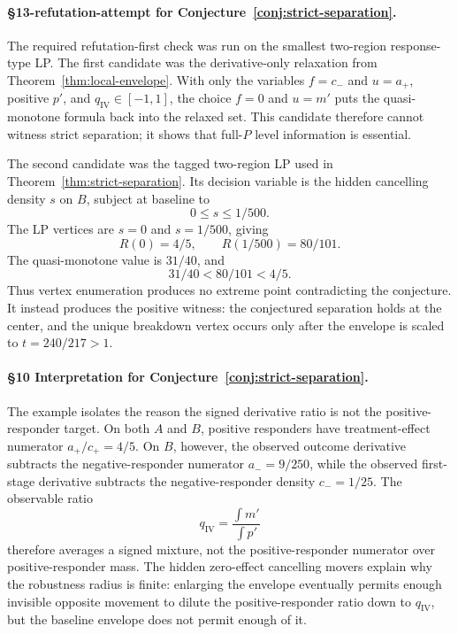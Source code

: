 \paragraph{\S13-refutation-attempt for Conjecture~\ref{conj:strict-separation}.}
The required refutation-first check was run on the smallest two-region
response-type LP.  The first candidate was the derivative-only relaxation from
Theorem~\ref{thm:local-envelope}.  With only the variables \(f=c_-\) and
\(u=a_+\), positive \(p'\), and \(q_{\mathrm{IV}}\in[-1,1]\), the choice
\(f=0\) and \(u=m'\) puts the quasi-monotone formula back into the relaxed
set.  This candidate therefore cannot witness strict separation; it shows that
full-\(P\) level information is essential.

The second candidate was the tagged two-region LP used in
Theorem~\ref{thm:strict-separation}.  Its decision variable is the hidden
cancelling density \(s\) on \(B\), subject at baseline to
\[
0\le s\le1/500.
\]
The LP vertices are \(s=0\) and \(s=1/500\), giving
\[
R(0)=4/5,\qquad R(1/500)=80/101.
\]
The quasi-monotone value is \(31/40\), and
\[
31/40<80/101<4/5.
\]
Thus vertex enumeration produces no extreme point contradicting the conjecture.
It instead produces the positive witness: the conjectured separation holds at
the center, and the unique breakdown vertex occurs only after the envelope is
scaled to \(t=240/217>1\).

\paragraph{\S10 Interpretation for Conjecture~\ref{conj:strict-separation}.}
The example isolates the reason the signed derivative ratio is not the
positive-responder target.  On both \(A\) and \(B\), positive responders have
treatment-effect numerator \(a_+/c_+=4/5\).  On \(B\), however, the observed
outcome derivative subtracts the negative-responder numerator
\(a_-=9/250\), while the observed first-stage derivative subtracts the
negative-responder density \(c_-=1/25\).  The observable ratio
\[
q_{\mathrm{IV}}=\frac{\int m'}{\int p'}
\]
therefore averages a signed mixture, not the positive-responder numerator over
positive-responder mass.  The hidden zero-effect cancelling movers explain why
the robustness radius is finite: enlarging the envelope eventually permits
enough invisible opposite movement to dilute the positive-responder ratio down
to \(q_{\mathrm{IV}}\), but the baseline envelope does not permit enough of it.

